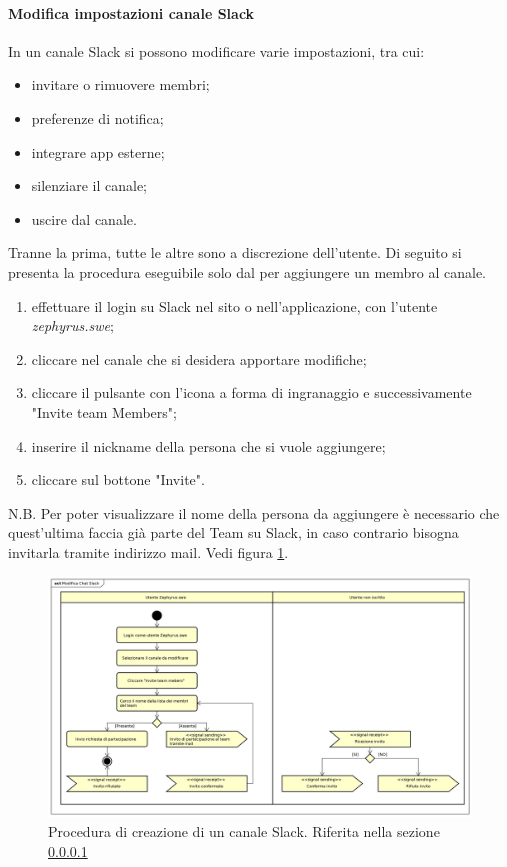 		\paragraph{Modifica impostazioni canale Slack}\label{sec:ModCanale}
		In un canale Slack si possono modificare varie impostazioni, tra cui: 
		\begin{itemize}
			\item invitare o rimuovere membri;
			\item preferenze di notifica;
			\item integrare app esterne;
			\item silenziare il canale;
			\item uscire dal canale.
		\end{itemize}
		Tranne la prima, tutte le altre sono a discrezione dell'utente. Di seguito si presenta la procedura eseguibile solo dal \responsabile{} per aggiungere un membro al canale. 
		\begin{enumerate}
			\item effettuare il login su Slack nel sito o nell'applicazione, con l'utente \textit{zephyrus.swe};
			\item cliccare nel canale che si desidera apportare modifiche;
			\item cliccare il pulsante con l'icona a forma di ingranaggio e successivamente "Invite team Members";
			\item inserire il nickname della persona che si vuole aggiungere;
			\item cliccare sul bottone "Invite".
		\end{enumerate}
		N.B. Per poter visualizzare il nome della persona da aggiungere è necessario che quest'ultima faccia già parte del Team su Slack, in caso contrario bisogna invitarla tramite indirizzo mail.
		Vedi figura \ref{fig:ProModChannel}.
		\begin{figure}[h!]
			\centering
			\includegraphics[width=\textwidth]{img/ProModChannel}
			\caption{Procedura di creazione di un canale Slack. Riferita nella sezione \ref{sec:ModCanale}}
			\label{fig:ProModChannel}
		\end{figure}\mbox{}\\	
	
